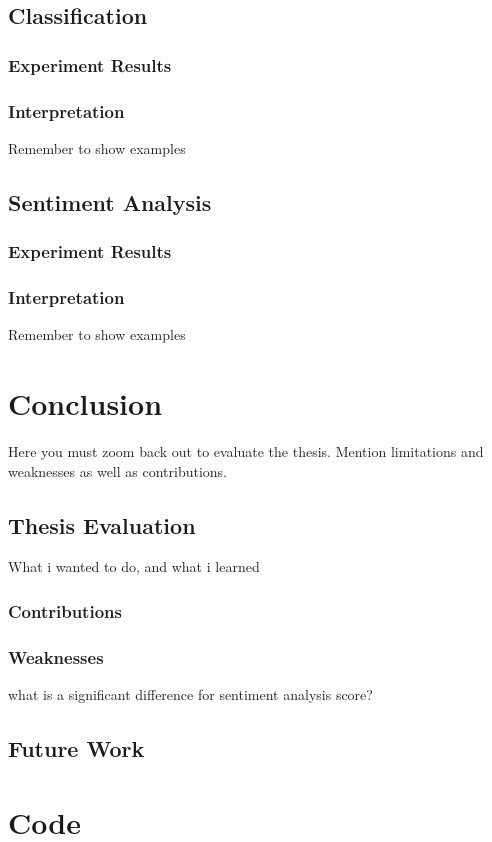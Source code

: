 \documentclass[oneside,12pt]{Classes/RoboticsLaTeX}
\begin{document}
\section{Classification}
\subsection{Experiment Results}
\subsection{Interpretation}
Remember to show examples

\section{Sentiment Analysis}
\subsection{Experiment Results}
\subsection{Interpretation}
Remember to show examples

\chapter{Conclusion}
\label{chap:conclusion}
Here you must zoom back out to evaluate the thesis. Mention limitations and weaknesses as well as contributions.

\section{Thesis Evaluation}
What i wanted to do, and what i learned
\subsection{Contributions}
\subsection{Weaknesses}
what is a significant difference for sentiment analysis score?
\section{Future Work}

\renewcommand{\bibname}{References}           %


\appendix
\chapter{Code} 
\label{chap:Code}

\end{document}
